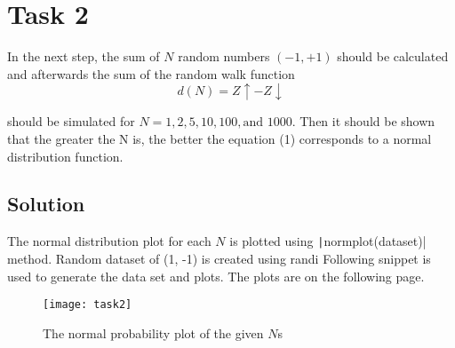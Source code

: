 \newpage
\section{Task 2}
In the next step, the sum of $N$ random numbers $(-1,+1)$ should be calculated and afterwards the sum of the random walk function
\begin{equation}
    d(N) = Z\uparrow - Z\downarrow
\end{equation}

should be simulated for $N = 1, 2, 5, 10, 100, \text{and }1000$. Then it should be shown that the greater the N is, the better the equation (1) corresponds to a normal distribution function.

\subsection*{Solution}
The normal distribution plot for each $N$ is plotted using \texttt|normplot(dataset)| method. Random dataset of (1, -1) is created using randi Following snippet is used to generate the data set and plots. The plots are on the following page.

\begin{listing}[H]
    
\end{listing}

\begin{figure}
    \centering
    \texttt{[image: task2]}
    \caption{The normal probability plot of the given $N$s}
\end{figure}
\thispagestyle{empty}
\restoregeometry

